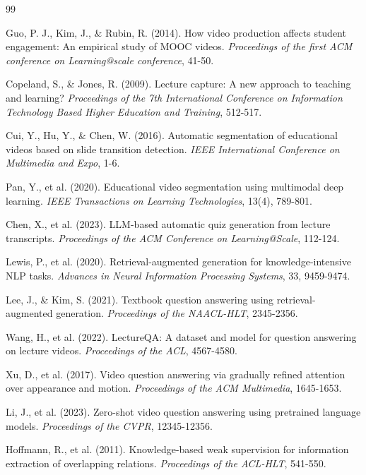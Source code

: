 \documentclass[12pt,a4paper]{article}
\begin{document}
\begin{thebibliography}{99}

Guo, P. J., Kim, J., \& Rubin, R. (2014). How video production affects student engagement: An empirical study of MOOC videos. \textit{Proceedings of the first ACM conference on Learning@scale conference}, 41-50.

Copeland, S., \& Jones, R. (2009). Lecture capture: A new approach to teaching and learning? \textit{Proceedings of the 7th International Conference on Information Technology Based Higher Education and Training}, 512-517.

Cui, Y., Hu, Y., \& Chen, W. (2016). Automatic segmentation of educational videos based on slide transition detection. \textit{IEEE International Conference on Multimedia and Expo}, 1-6.

Pan, Y., et al. (2020). Educational video segmentation using multimodal deep learning. \textit{IEEE Transactions on Learning Technologies}, 13(4), 789-801.

Chen, X., et al. (2023). LLM-based automatic quiz generation from lecture transcripts. \textit{Proceedings of the ACM Conference on Learning@Scale}, 112-124.

Lewis, P., et al. (2020). Retrieval-augmented generation for knowledge-intensive NLP tasks. \textit{Advances in Neural Information Processing Systems}, 33, 9459-9474.

Lee, J., \& Kim, S. (2021). Textbook question answering using retrieval-augmented generation. \textit{Proceedings of the NAACL-HLT}, 2345-2356.

Wang, H., et al. (2022). LectureQA: A dataset and model for question answering on lecture videos. \textit{Proceedings of the ACL}, 4567-4580.

Xu, D., et al. (2017). Video question answering via gradually refined attention over appearance and motion. \textit{Proceedings of the ACM Multimedia}, 1645-1653.

Li, J., et al. (2023). Zero-shot video question answering using pretrained language models. \textit{Proceedings of the CVPR}, 12345-12356.

Hoffmann, R., et al. (2011). Knowledge-based weak supervision for information extraction of overlapping relations. \textit{Proceedings of the ACL-HLT}, 541-550.


\end{thebibliography}
\end{document}
